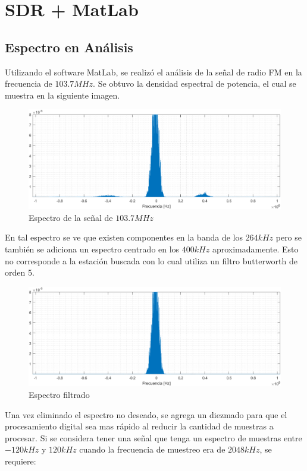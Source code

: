 \section*{SDR + MatLab}
\subsection*{Espectro en Análisis}
Utilizando el software MatLab, se realizó el análisis de la señal de radio FM en la frecuencia de $103.7MHz$. Se obtuvo la densidad espectral de potencia, el cual se muestra en la siguiente imagen.
\begin{figure}[H]
    \centering
    \includegraphics[width=\columnwidth]{images/2.1-original.png}
    \caption{Espectro de la señal de $103.7 MHz$}
    \label{fig:imagen4}
\end{figure}
En tal espectro se ve que existen componentes en la banda de los $264kHz$ pero se también se adiciona un espectro centrado en los $400kHz$ aproximadamente. Esto no corresponde a la estación buscada con lo cual utiliza un filtro butterworth de orden 5.
\begin{figure}[H]
    \centering
    \includegraphics[width=\columnwidth]{images/2.2-filtrando.png}
    \caption{Espectro filtrado}
    \label{fig:imagen5}
\end{figure}
Una vez eliminado el espectro no deseado, se agrega un diezmado para que el procesamiento digital sea mas rápido al reducir la cantidad de muestras a procesar. Si se considera tener una señal que tenga un espectro de muestras entre $-120kHz$ y $120kHz$ cuando la frecuencia de muestreo era de $2048kHz$, se requiere:
